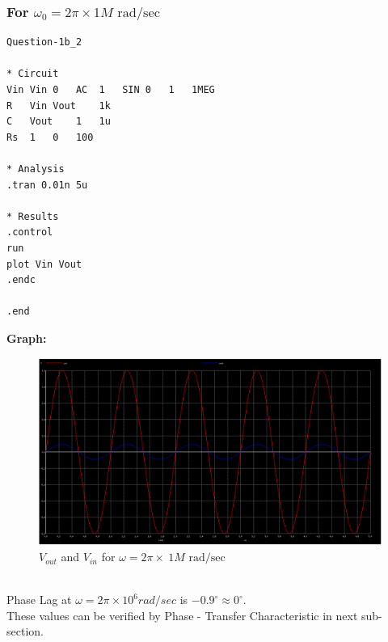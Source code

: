 \documentclass{article}
\begin{document}
\subsubsection{For $\omega_0 = 2\pi\times1M \text{ rad/sec}$}
\begin{lstlisting}
Question-1b_2

* Circuit
Vin	Vin	0	AC	1	SIN	0	1	1MEG
R	Vin	Vout	1k
C	Vout	1	1u
Rs	1	0	100

* Analysis
.tran 0.01n 5u

* Results
.control
run
plot Vin Vout
.endc

.end	
\end{lstlisting}

\textbf{Graph:}
\begin{figure}[!ht]
    \centering
    \includegraphics[scale=0.25]{Images/1b_2.png}
    \caption{$V_{out}$ and $V_{in}$ for $\omega = 2\pi\times\ 1M \text{ rad/sec}$}
\end{figure}\\
Phase Lag at $\omega = 2\pi\times10^6 rad/sec$ is $-0.9^{\circ} \approx 0^{\circ}$.
\\
These values can be verified by Phase - Transfer Characteristic in next sub-section.

\end{document}
